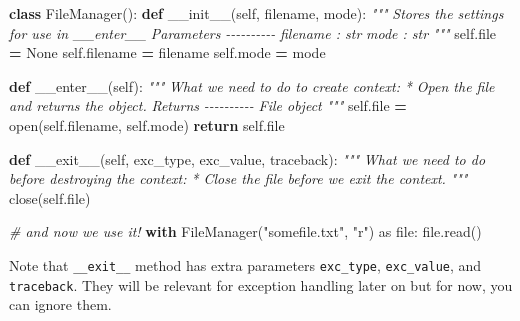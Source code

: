 \documentclass[
]{book}
\newenvironment{Shaded}{\begin{snugshade}}{\end{snugshade}}
\newcommand{\BuiltInTok}[1]{#1}
\newcommand{\CommentTok}[1]{\textcolor[rgb]{0.56,0.35,0.01}{\textit{#1}}}
\newcommand{\ControlFlowTok}[1]{\textcolor[rgb]{0.13,0.29,0.53}{\textbf{#1}}}
\newcommand{\FunctionTok}[1]{\textcolor[rgb]{0.00,0.00,0.00}{#1}}
\newcommand{\ImportTok}[1]{#1}
\newcommand{\KeywordTok}[1]{\textcolor[rgb]{0.13,0.29,0.53}{\textbf{#1}}}
\newcommand{\NormalTok}[1]{#1}
\newcommand{\OperatorTok}[1]{\textcolor[rgb]{0.81,0.36,0.00}{\textbf{#1}}}
\newcommand{\StringTok}[1]{\textcolor[rgb]{0.31,0.60,0.02}{#1}}
\newcommand{\VariableTok}[1]{\textcolor[rgb]{0.00,0.00,0.00}{#1}}
\begin{document}
\begin{Shaded}
\begin{Highlighting}[]
\KeywordTok{class}\NormalTok{ FileManager():}
    \KeywordTok{def} \FunctionTok{\_\_init\_\_}\NormalTok{(}\VariableTok{self}\NormalTok{, filename, mode):}
        \CommentTok{"""}
\CommentTok{        Stores the settings for use in \_\_enter\_\_}
\CommentTok{        }
\CommentTok{        Parameters}
\CommentTok{        {-}{-}{-}{-}{-}{-}{-}{-}{-}{-}}
\CommentTok{        filename : str}
\CommentTok{        mode : str}
\CommentTok{        """}
        \VariableTok{self}\NormalTok{.}\BuiltInTok{file} \OperatorTok{=} \VariableTok{None}
        \VariableTok{self}\NormalTok{.filename }\OperatorTok{=}\NormalTok{ filename}
        \VariableTok{self}\NormalTok{.mode }\OperatorTok{=}\NormalTok{ mode}
        
    \KeywordTok{def} \FunctionTok{\_\_enter\_\_}\NormalTok{(}\VariableTok{self}\NormalTok{):}
      \CommentTok{""" }
\CommentTok{      What we need to do to create context:}
\CommentTok{        * Open the file and returns the object.}
\CommentTok{      }
\CommentTok{      Returns}
\CommentTok{      {-}{-}{-}{-}{-}{-}{-}{-}{-}{-}}
\CommentTok{      File object}
\CommentTok{      """}
      \VariableTok{self}\NormalTok{.}\BuiltInTok{file} \OperatorTok{=} \BuiltInTok{open}\NormalTok{(}\VariableTok{self}\NormalTok{.filename, }\VariableTok{self}\NormalTok{.mode)}
      \ControlFlowTok{return} \VariableTok{self}\NormalTok{.}\BuiltInTok{file}
      
    \KeywordTok{def} \FunctionTok{\_\_exit\_\_}\NormalTok{(}\VariableTok{self}\NormalTok{, exc\_type, exc\_value, traceback):}
      \CommentTok{"""}
\CommentTok{      What we need to do before destroying the context:}
\CommentTok{        * Close the file before we exit the context.}
\CommentTok{      """}
\NormalTok{      close(}\VariableTok{self}\NormalTok{.}\BuiltInTok{file}\NormalTok{)}
      
\CommentTok{\# and now we use it!}
\ControlFlowTok{with}\NormalTok{ FileManager(}\StringTok{"somefile.txt"}\NormalTok{, }\StringTok{"r"}\NormalTok{) }\ImportTok{as} \BuiltInTok{file}\NormalTok{:}
    \BuiltInTok{file}\NormalTok{.read()}
\end{Highlighting}
\end{Shaded}

Note that \texttt{\_\_exit\_\_} method has extra parameters \texttt{exc\_type}, \texttt{exc\_value}, and \texttt{traceback}. They will be relevant for exception handling later on but for now, you can ignore them.
\end{document}

